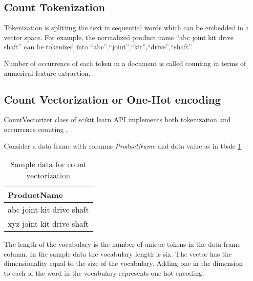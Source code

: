 \subsection{Count Tokenization}

Tokenization is splitting the text in sequential words which can be embedded in a vector space.
For example, the normalized product name ``abc joint kit drive shaft'' can be tokenized into  ``abc'',``joint'',``kit'',``drive'',``shaft''. 

Number of occurrence of each token in a document is called counting in terms of numerical feature extraction.

\subsection{Count Vectorization or One-Hot encoding} \label{ch_countvector}


CountVectorizer class of scikit learn API implements both tokenization and occurrence counting \parencite{sklearn_api}. 

Consider a data frame with columns \textit{ProductName} and data value as in tbale \ref{table:count_vectorization}

\begin{table}[h]
    \centering
    \caption{Sample data for count vectorization}
    \label{table:count_vectorization}
    \begin{tabular}{ l }
          \toprule
          
          \textbf{ProductName}\\
          \midrule
          abc joint kit drive shaft\\
          xyz joint kit drive shaft\\
         
          \bottomrule
          \end{tabular}
\end{table}

The length of the vocabulary is the number of unique tokens in the data frame column. In the sample data the vocabulary length is six. The vector has the dimensionality equal to the size of the vocabulary. Adding one in the dimension to each of the word in the vocabulary represents one hot encoding.


